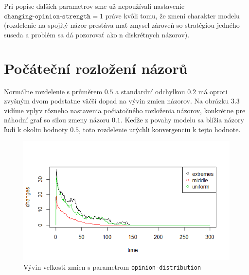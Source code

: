 \documentclass[10pt,a4paper]{report}
\begin{document}
Pri popise ďalších parametrov sme už nepoužívali nastavenie $\texttt{changing-opinion-strength} = 1$ práve kvôli tomu, že zmení charakter modelu (rozdelenie na spojitý názor prestáva mať zmysel zároveň so stratégiou jedného suseda a problém sa dá pozorovať ako n diskrétnych názorov).

\section{Počáteční rozložení názorů}
Normálne rozdelenie s průměrem $0.5$ a standardní odchylkou $0.2$ má oproti zvyšným dvom podstatne väčší dopad na vývin zmien názorov. Na obrázku 3.3 vidíme vplyv rôzneho nastavenia počiatočného rozloženia názorov, konkrétne pre náhodní graf so silou zmeny názoru $0.1$. Keďže z povahy modelu sa blížia názory ľudí k okoliu hodnoty $0.5$, toto rozdelenie urýchli konvergenciu k tejto hodnote.
\begin{figure}
  \includegraphics[width=\textwidth]{plots/small-world-g/smallWorldDistribution.png}
  \caption{Vývin veľkosti zmien s parametrom \texttt{opinion-distribution} }
\end{figure}
\end{document}
